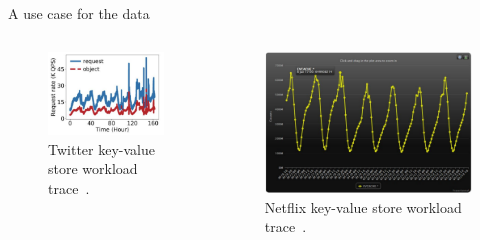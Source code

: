 \documentclass[notes=only,10pt,xcolor=table]{beamer}
\begin{document}
\begin{frame}{A use case for the data}
\begin{columns}
    \begin{column}{.5\textwidth}
        \begin{figure}
            \includegraphics[width=1\textwidth]{img/twitter_mcd.pdf}
            \caption{Twitter key-value store workload trace~\cite{twittermcd}.}
        \end{figure}
    \end{column}
    \begin{column}{.5\textwidth}
        \begin{figure}
            \includegraphics[width=1\textwidth]{img/netflix_mcd.pdf}
            \caption{Netflix key-value store workload trace~\cite{netflixmcd}.}
        \end{figure}
    \end{column}
\end{columns}    
\end{frame}
\end{document}
